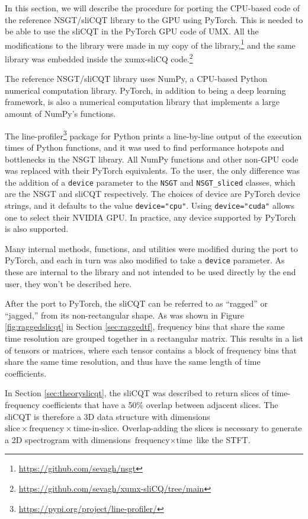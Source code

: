 \documentclass[report.tex]{subfiles}
\begin{document}
In this section, we will describe the procedure for porting the CPU-based code of the reference NSGT/sliCQT library to the GPU using PyTorch. This is needed to be able to use the sliCQT in the PyTorch GPU code of UMX. All the modifications to the library were made in my copy of the library,\footnote{\url{https://github.com/sevagh/nsgt}} and the same library was embedded inside the xumx-sliCQ code.\footnote{\url{https://github.com/sevagh/xumx-sliCQ/tree/main}}

The reference NSGT/sliCQT library uses NumPy, a CPU-based Python numerical computation library. PyTorch, in addition to being a deep learning framework, is also a numerical computation library that implements a large amount of NumPy's functions.

The line-profiler\footnote{\url{https://pypi.org/project/line-profiler/}} package for Python prints a line-by-line output of the execution times of Python functions, and it was used to find performance hotspots and bottlenecks in the NSGT library. All NumPy functions and other non-GPU code was replaced with their PyTorch equivalents. To the user, the only difference was the addition of a \Verb#device# parameter to the \Verb#NSGT# and \Verb#NSGT_sliced# classes, which are the NSGT and sliCQT respectively. The choices of device are PyTorch device strings, and it defaults to the value \Verb#device="cpu"#. Using \Verb#device="cuda"# allows one to select their NVIDIA GPU. In practice, any device supported by PyTorch is also supported.

Many internal methods, functions, and utilities were modified during the port to PyTorch, and each in turn was also modified to take a \Verb#device# parameter. As these are internal to the library and not intended to be used directly by the end user, they won't be described here.

After the port to PyTorch, the sliCQT can be referred to as ``ragged'' or ``jagged,'' from its non-rectangular shape. As was shown in Figure \ref{fig:raggedslicqt} in Section \ref{sec:raggedtf}, frequency bins that share the same time resolution are grouped together in a rectangular matrix. This results in a list of tensors or matrices, where each tensor contains a block of frequency bins that share the same time resolution, and thus have the same length of time coefficients.

In Section \ref{sec:theoryslicqt}, the sliCQT was described to return slices of time-frequency coefficients that have a 50\% overlap between adjacent slices. The sliCQT is therefore a 3D data structure with dimensions $\text{slice} \times \text{frequency} \times \text{time-in-slice}$. Overlap-adding the slices is necessary to generate a 2D spectrogram with dimensions $\text{frequency} \times \text{time}$ like the STFT.
\end{document}
